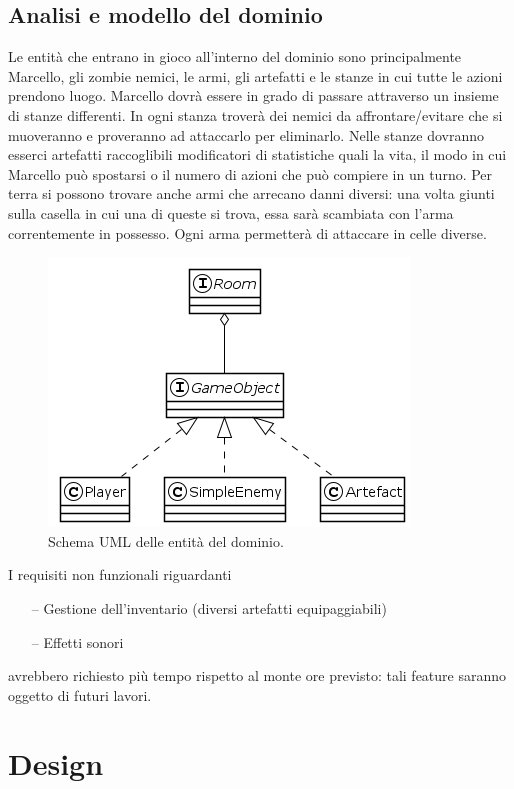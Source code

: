 \documentclass[a4paper,titlepage,12pt]{article}
\begin{document}
\subsection{Analisi e modello del dominio}
Le entità che entrano in gioco all'interno del dominio sono principalmente Marcello, gli zombie nemici, le armi, gli artefatti e le stanze in cui tutte le azioni prendono luogo.
Marcello dovrà essere in grado di passare attraverso un insieme di stanze differenti. In ogni stanza troverà dei nemici da affrontare/evitare che si muoveranno e proveranno ad attaccarlo per eliminarlo. Nelle stanze dovranno esserci artefatti raccoglibili modificatori di statistiche quali la vita, il modo in cui Marcello può spostarsi o il numero di azioni che può compiere in un turno. Per terra si possono trovare anche armi che arrecano danni diversi: una volta giunti sulla casella in cui una di queste si trova, essa sarà scambiata con l'arma correntemente in possesso. Ogni arma permetterà di attaccare in celle diverse.
\begin{figure}[H]
    \centering
    \includegraphics[scale=0.8]{img/uml/Entity.png}
    \caption{Schema UML delle entità del dominio.}
    \label{img:model}
\end{figure}
\noindent I requisiti non funzionali riguardanti
\begin{itemize}
    \item[--] Gestione dell'inventario (diversi artefatti equipaggiabili)
    \item[--] Effetti sonori
\end{itemize}
avrebbero richiesto più tempo rispetto al monte ore previsto: tali feature saranno oggetto di futuri lavori.

\newpage
\section{Design}
\end{document}
